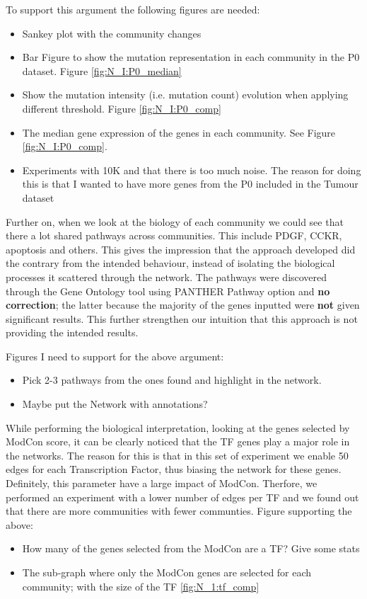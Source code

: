 To support this argument the following figures are needed:
\begin{itemize}
    \item Sankey plot with the community changes
    \item Bar Figure to show the mutation representation in each community in the P0 dataset. Figure \ref{fig:N_I:P0_median}
    \item Show the mutation intensity (i.e. mutation count) evolution when applying different threshold.  Figure \ref{fig:N_I:P0_comp}
    \item The median gene expression of the genes in each community. See Figure \ref{fig:N_I:P0_comp}.
    \item Experiments with 10K and that there is too much noise. The reason for doing this is that I wanted to have more genes from the P0 included in the Tumour dataset
\end{itemize}

Further on, when we look at the biology of each community we could see that there a lot shared pathways across communities. This include PDGF, CCKR, apoptosis and others. This gives the impression that the approach developed did the contrary from the intended behaviour, instead of isolating the biological processes it scattered through the network. The pathways were discovered through the Gene Ontology tool using PANTHER Pathway option and \textbf{no correction}; the latter because the majority of the genes inputted were \textbf{not} given significant results. This further strengthen our intuition that this approach is not providing the intended results.

Figures I need to support for the above argument:
\begin{itemize}
    \item Pick 2-3 pathways from the ones found and highlight in the network.
    \item Maybe put the Network with annotations?
\end{itemize}

While performing the biological interpretation, looking at the genes selected by ModCon score, it can be clearly noticed that the TF genes play a major role in the networks. The reason for this is that in this set of experiment we enable 50 edges for each Transcription Factor, thus biasing the network for these genes. Definitely, this parameter have a large impact of ModCon. Therfore, we performed an experiment with a lower number of edges per TF and we found out that there are more communities with fewer communties.
Figure supporting the above:
\begin{itemize}
    \item How many of the genes selected from the ModCon are a TF? Give some stats
    \item The sub-graph where only the ModCon genes are selected for each community; with the size of the TF \ref{fig:N_1:tf_comp}
\end{itemize}

